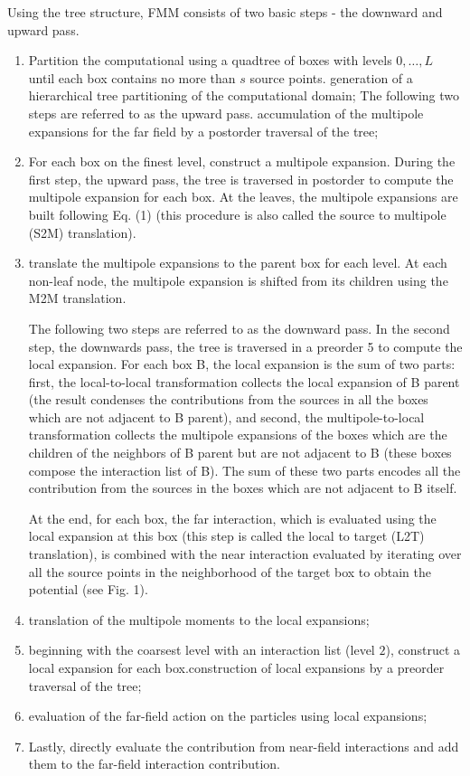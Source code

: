 \documentclass[11pt, oneside]{article}   	%
\begin{document}
Using the tree structure, FMM consists of two basic steps - the downward and upward pass.
\begin{enumerate}
\item Partition the computational using a quadtree of boxes with levels $0,\dots,L$ until each box contains no more than $s$ source points. generation of a hierarchical tree partitioning of the computational domain;
The following two steps are referred to as the upward pass. accumulation of the multipole expansions for the far field by a postorder traversal of the tree;
\item For each box on the finest level, construct a multipole expansion. During the first step, the upward pass, the tree is traversed in postorder to compute the multipole expansion for each box. At the leaves, the multipole expansions are built following Eq. (1) (this procedure is also called the source to multipole (S2M) translation). 
\item translate the multipole expansions to the parent box for each level. At each non-leaf node, the multipole expansion is shifted from its children using the M2M translation.

The following two steps are referred to as the downward pass. In the second step, the downwards pass, the tree is traversed in a preorder 5 to compute the local expansion. For each box B, the local expansion is the sum of two parts: first, the local-to-local transformation collects the local expansion of B parent (the result condenses the contributions from the sources in all the boxes which are not adjacent to B parent), and second, the multipole-to-local transformation collects the multipole expansions of the boxes which are the children of the neighbors of B parent but are not adjacent to B (these boxes compose the interaction list of B). The sum of these two parts encodes all the contribution from the sources in the boxes which are not adjacent to B itself.

At the end, for each box, the far interaction, which is evaluated using the local expansion at this box (this step is called the local to target (L2T) translation), is combined with the near interaction evaluated by iterating over all the source points in the neighborhood of the target box to obtain the potential (see Fig. 1).
\item translation of the multipole moments to the local expansions; 
\item beginning with the coarsest level with an interaction list (level $2$), construct a local expansion for each box.construction of local expansions by a preorder traversal of the tree;
\item evaluation of the far-field action on the particles using local expansions;
\item Lastly, directly evaluate the contribution from near-field interactions and add them to the far-field interaction contribution.
\end{enumerate}
\end{document}
